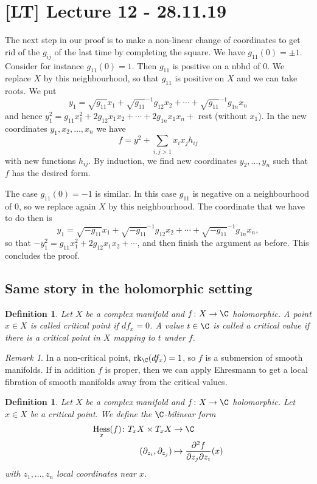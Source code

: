 \documentclass[A4paper, british]{amsart}
\theoremstyle{darkgreentheorem}
\theoremstyle{darkbluedefinition}
\newtheorem{defn}[thm]{Definition}
\theoremstyle{darkredexample}
\theoremstyle{remark}
\newtheorem{rem}[thm]{Remark}
\DeclareMathOperator{\rk}{rk}
\DeclareMathOperator{\Hess}{Hess}
\newcommand{\1}{\mathbbm{1}}
\begin{document}
\section{[LT] Lecture 12 - 28.11.19}

The next step in our proof is to make a non-linear change of coordinates to get rid of the $g_{ij}$ of the last time by completing the square.
We have $g_{11}(0)=\pm 1$.
Consider for instance $g_{11}(0)=1$.
Then $g_{11}$ is positive on a nbhd of $0$.
We replace $X$ by this neighbourhood, so that $g_{11}$ is positive on $X$ and we can take roots.
We put
\[ y_{1}=\sqrt{g_{11}}x_{1}+\sqrt{g_{11}}^{-1}g_{12}x_{2}+\cdots +\sqrt{g_{11}}^{-1}g_{1n}x_{n} \]
and hence $y_{1}^{2}=g_{11}x_{1}^{2}+2g_{12}x_{1}x_{2}+\cdots +2g_{1n}x_{1}x_{n}+$ rest (without $x_{1}$).
In the new coordinates $y_{1},x_{2},\ldots,x_{n}$ we have
\[ f=y^{2}+\sum_{i,j>1} x_{i}x_{j}h_{ij} \]
with new functions $h_{ij}$.
By induction, we find new coordinates $y_{2},\ldots,y_{n}$ such that $f$ has the desired form.

The case $g_{11}(0)=-1$ is similar.
In this case $g_{11}$ is negative on a neighbourhood of $0$, so we replace again $X$ by this neighbourhood.
The coordinate that we have to do then is
\[ y_{1}=\sqrt{-g_{11}}x_{1}+\sqrt{-g_{11}}^{-1}g_{12}x_{2}+\cdots +\sqrt{-g_{11}}^{-1}g_{1n}x_{n}, \]
so that $-y_{1}^{2}=g_{11}x_{1}^{2}+2g_{12}x_{1}x_{2}+\cdots$, and then finish the argument as before.
This concludes the proof.

\subsection{Same story in the holomorphic setting}

\begin{defn}
    Let $X$ be a complex manifold and $f\colon X\to \C$ holomorphic.
    A point $x\in X$ is called \textit{critical point} if $df_{x}=0$.
    A value $t\in \C$ is called a \textit{critical value} if there is a critical point in $X$ mapping to $t$ under $f$.
\end{defn}

\begin{rem}
    In a non-critical point, $\rk_{\C}(df_{x})=1$, so $f$ is a submersion of smooth manifolds.
    If in addition $f$ is proper, then we can apply Ehresmann to get a local fibration of smooth manifolds away from the critical values.
\end{rem}

\begin{defn}
    Let $X$ be a complex manifold and $f\colon X\to \C$ holomorphic.
    Let $x\in X$ be a critical point.
    We define the $\C$-bilinear form
    \begin{align*}
	\Hess_{x}(f)\colon T_{x}X\times T_{x}X & \to \C \\
	(\partial_{z_{i}},\partial_{z_{j}}) & \mapsto \frac{\partial^{2} f}{\partial z_{j}\partial z_{i}}(x)
    \end{align*}
    with $z_{1},\ldots,z_{n}$ local coordinates near $x$.
\end{defn}
\end{document}
